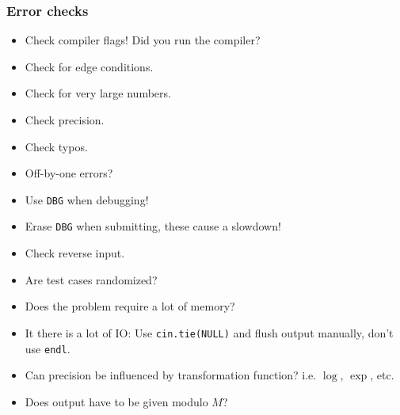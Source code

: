 \subsubsection{Error checks}
\begin{itemize}
    \item Check compiler flags! Did you run the compiler?
    \item Check for edge conditions.
    \item Check for very large numbers.
    \item Check precision.
    \item Check typos.
    \item Off-by-one errors?
    \item Use \texttt{DBG} when debugging!
    \item Erase \texttt{DBG} when submitting, these cause a slowdown!
    \item Check reverse input.
    \item Are test cases randomized?
    \item Does the problem require a lot of memory?
    \item It there is a lot of IO: Use \texttt{cin.tie(NULL)} and flush output manually, don't use \texttt{endl}.
    \item Can precision be influenced by transformation function? i.e. $\log$, $\exp$, etc.
    \item Does output have to be given modulo $M$?
\end{itemize}

